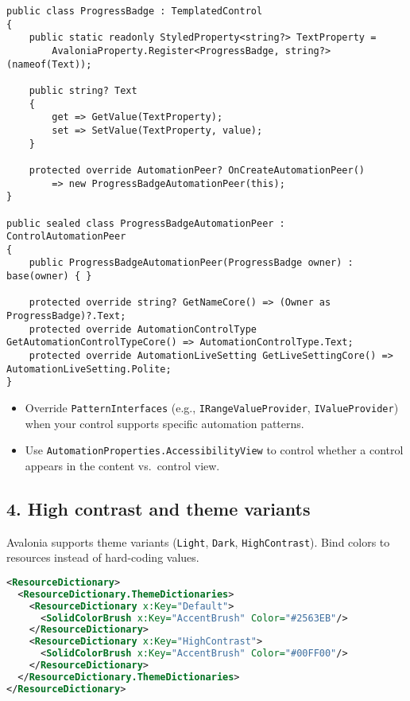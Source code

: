 \begin{lstlisting}
public class ProgressBadge : TemplatedControl
{
    public static readonly StyledProperty<string?> TextProperty =
        AvaloniaProperty.Register<ProgressBadge, string?>(nameof(Text));

    public string? Text
    {
        get => GetValue(TextProperty);
        set => SetValue(TextProperty, value);
    }

    protected override AutomationPeer? OnCreateAutomationPeer()
        => new ProgressBadgeAutomationPeer(this);
}

public sealed class ProgressBadgeAutomationPeer : ControlAutomationPeer
{
    public ProgressBadgeAutomationPeer(ProgressBadge owner) : base(owner) { }

    protected override string? GetNameCore() => (Owner as ProgressBadge)?.Text;
    protected override AutomationControlType GetAutomationControlTypeCore() => AutomationControlType.Text;
    protected override AutomationLiveSetting GetLiveSettingCore() => AutomationLiveSetting.Polite;
}
\end{lstlisting}

\begin{itemize}
\tightlist
\item
  Override \passthrough{\lstinline!PatternInterfaces!} (e.g.,
  \passthrough{\lstinline!IRangeValueProvider!},
  \passthrough{\lstinline!IValueProvider!}) when your control supports
  specific automation patterns.
\item
  Use \passthrough{\lstinline!AutomationProperties.AccessibilityView!}
  to control whether a control appears in the content vs.~control view.
\end{itemize}

\subsection{4. High contrast and theme
variants}\label{high-contrast-and-theme-variants}

Avalonia supports theme variants (\passthrough{\lstinline!Light!},
\passthrough{\lstinline!Dark!}, \passthrough{\lstinline!HighContrast!}).
Bind colors to resources instead of hard-coding values.

\begin{lstlisting}[language=XML]
<ResourceDictionary>
  <ResourceDictionary.ThemeDictionaries>
    <ResourceDictionary x:Key="Default">
      <SolidColorBrush x:Key="AccentBrush" Color="#2563EB"/>
    </ResourceDictionary>
    <ResourceDictionary x:Key="HighContrast">
      <SolidColorBrush x:Key="AccentBrush" Color="#00FF00"/>
    </ResourceDictionary>
  </ResourceDictionary.ThemeDictionaries>
</ResourceDictionary>
\end{lstlisting}

